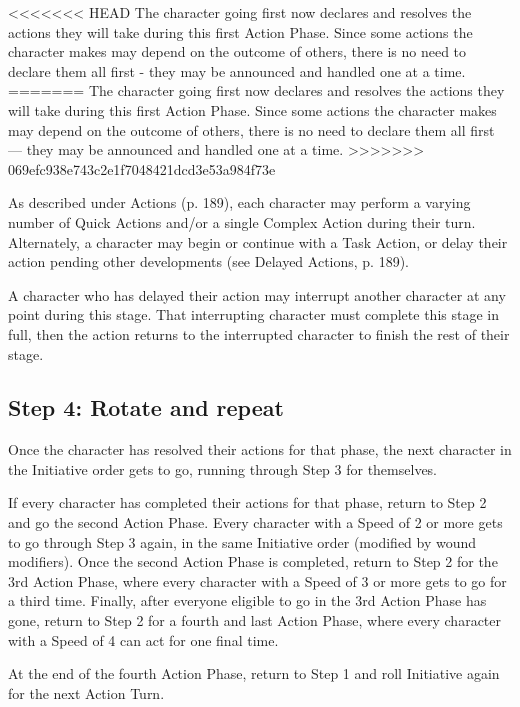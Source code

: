 <<<<<<< HEAD The character going first now declares and resolves the actions they will take during this first Action Phase. Since some actions the character makes may depend on the outcome of others, there is no need to declare them all first - they may be announced and handled one at a time. ======= The character going first now declares and resolves the actions they will take during this first Action Phase. Since some actions the character makes may depend on the outcome of others, there is no need to declare them all first --- they may be announced and handled one at a time. >>>>>>> 069efc938e743c2e1f7048421dcd3e53a984f73e 

As described under Actions (p. 189), each character may perform a varying number of Quick Actions and/or a single Complex Action during their turn. Alternately, a character may begin or continue with a Task Action, or delay their action pending other developments (see Delayed Actions, p. 189). 

A character who has delayed their action may interrupt another character at any point during this stage. That interrupting character must complete this stage in full, then the action returns to the interrupted character to finish the rest of their stage. 



\subsection{Step 4: Rotate and repeat} \label{sec:rotate-repeat} 

Once the character has resolved their actions for that phase, the next character in the Initiative order gets to go, running through Step 3 for themselves. 

If every character has completed their actions for that phase, return to Step 2 and go the second Action Phase. Every character with a Speed of 2 or more gets to go through Step 3 again, in the same Initiative order (modified by wound modifiers). Once the second Action Phase is completed, return to Step 2 for the 3rd Action Phase, where every character with a Speed of 3 or more gets to go for a third time. Finally, after everyone eligible to go in the 3rd Action Phase has gone, return to Step 2 for a fourth and last Action Phase, where every character with a Speed of 4 can act for one final time. 

At the end of the fourth Action Phase, return to Step 1 and roll Initiative again for the next Action Turn. 



